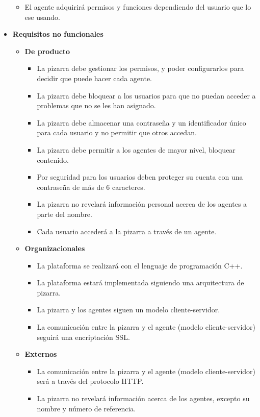 \begin{itemize}
\begin{itemize}
			\item El agente adquirirá permisos y funciones dependiendo del usuario que lo ese usando.
		\end{itemize}
\item \textbf{Requisitos no funcionales}
		\begin{itemize}
			\item \textbf{De producto}
					\begin{itemize}
					\item La pizarra debe gestionar los permisos, y poder configurarlos para decidir que puede hacer cada agente.
					\item La pizarra debe bloquear a los usuarios para que no puedan acceder a problemas que no se les han asignado.
					\item La pizarra debe almacenar una contraseña y un identificador único para cada usuario y no permitir que otros accedan.
					\item La pizarra debe permitir a los agentes de mayor nivel, bloquear contenido.
					\item Por seguridad para los usuarios deben proteger su cuenta con una contraseña de más de 6 caracteres.
					\item La pizarra no revelará información personal acerca de los agentes a parte del nombre.
					\item Cada usuario accederá a la pizarra a través de un agente.
					\end{itemize}
			\item \textbf{Organizacionales}
					\begin{itemize}
					\item La plataforma se realizará con el lenguaje de programación C++.
					\item La plataforma estará implementada siguiendo una arquitectura de pizarra.
					\item La pizarra y los agentes siguen un modelo cliente-servidor.
					\item La comunicación entre la pizarra y el agente (modelo cliente-servidor) seguirá una encriptación SSL.
					\end{itemize}
			\item \textbf{Externos}
					\begin{itemize}
					\item La comunicación entre la pizarra y el agente (modelo cliente-servidor) será a través del protocolo HTTP.
					\item La pizarra no revelará información acerca de los agentes, excepto su nombre y número de referencia.
					\end{itemize}
		\end{itemize}
\end{itemize}

